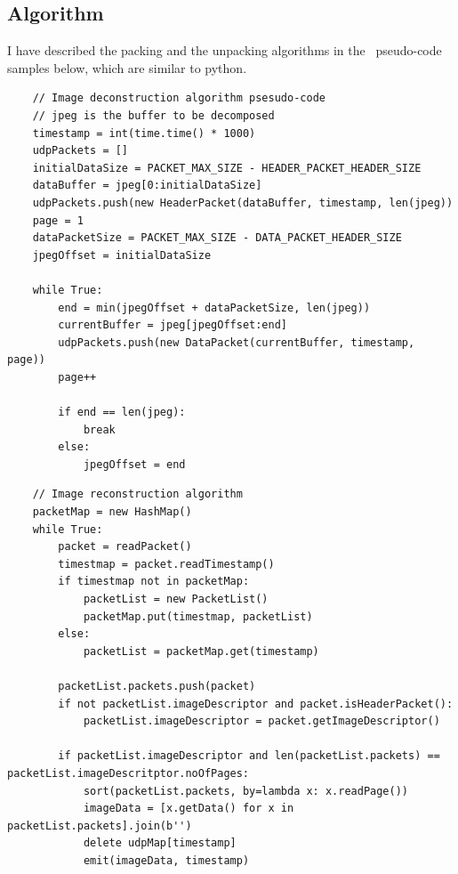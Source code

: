 \subsection{Algorithm}
\label{subsec:udp-packer-algorithm}
I have described the packing and the unpacking algorithms in the \
pseudo-code samples below, which are similar to python.

\begin{verbatim}
    // Image deconstruction algorithm psesudo-code
    // jpeg is the buffer to be decomposed
    timestamp = int(time.time() * 1000)
    udpPackets = []
    initialDataSize = PACKET_MAX_SIZE - HEADER_PACKET_HEADER_SIZE
    dataBuffer = jpeg[0:initialDataSize]
    udpPackets.push(new HeaderPacket(dataBuffer, timestamp, len(jpeg))
    page = 1
    dataPacketSize = PACKET_MAX_SIZE - DATA_PACKET_HEADER_SIZE
    jpegOffset = initialDataSize

    while True:
        end = min(jpegOffset + dataPacketSize, len(jpeg))
        currentBuffer = jpeg[jpegOffset:end]
        udpPackets.push(new DataPacket(currentBuffer, timestamp, page))
        page++

        if end == len(jpeg):
            break
        else:
            jpegOffset = end
\end{verbatim}

\begin{verbatim}
    // Image reconstruction algorithm
    packetMap = new HashMap()
    while True:
        packet = readPacket()
        timestmap = packet.readTimestamp()
        if timestmap not in packetMap:
            packetList = new PacketList()
            packetMap.put(timestmap, packetList)
        else:
            packetList = packetMap.get(timestamp)

        packetList.packets.push(packet)
        if not packetList.imageDescriptor and packet.isHeaderPacket():
            packetList.imageDescriptor = packet.getImageDescriptor()

        if packetList.imageDescriptor and len(packetList.packets) == packetList.imageDescritptor.noOfPages:
            sort(packetList.packets, by=lambda x: x.readPage())
            imageData = [x.getData() for x in packetList.packets].join(b'')
            delete udpMap[timestamp]
            emit(imageData, timestamp)
\end{verbatim}

